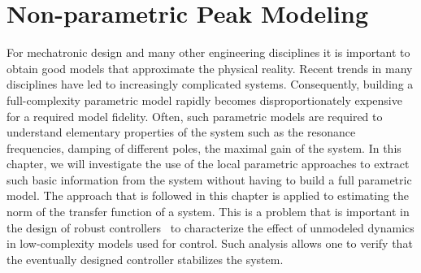\chapter{Non-parametric Peak Modeling}
\label{sec:hinf}
\def\thisDir{ch04-lrmhinf}
\glsresetall


\newcommand{\wnValue}{\ensuremath{0.95 \unit{rad/s}}}
\newcommand{\dampingValue}{\ensuremath{0.025}}
\newcommand{\TsValue}{\ensuremath{1 \unit{s}}}


For mechatronic design and many other engineering disciplines it is important to obtain good  models that approximate the physical reality.
Recent trends in many disciplines have led to increasingly complicated systems.
Consequently, building a full-complexity parametric model rapidly becomes disproportionately expensive for a required model fidelity.
Often, such parametric models are required to understand elementary properties of the system such as the resonance frequencies, damping of different poles, the maximal gain of the system.
In this chapter, we will investigate the use of the local parametric approaches to extract such basic information from the system without having to build a full parametric model.
The approach that is followed in this chapter is applied to estimating the \Hinf{} norm of the transfer function of a system.
This is a problem that is important in the design of robust controllers~\citep{Oomen2016} to characterize the effect of unmodeled dynamics in low-complexity models used for control.
Such analysis allows one to verify that the eventually designed controller stabilizes the system.

